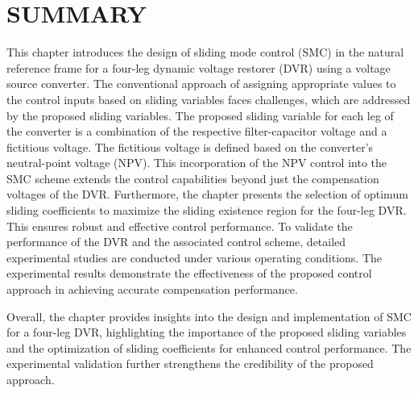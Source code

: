\section{SUMMARY}
This chapter introduces the design of sliding mode control (SMC) in the natural reference frame for a four-leg dynamic voltage restorer (DVR) using a voltage source converter. The conventional approach of assigning appropriate values to the control inputs based on sliding variables faces challenges, which are addressed by the proposed sliding variables.
The proposed sliding variable for each leg of the converter is a combination of the respective filter-capacitor voltage and a fictitious voltage. The fictitious voltage is defined based on the converter's neutral-point voltage (NPV). This incorporation of the NPV control into the SMC scheme extends the control capabilities beyond just the compensation voltages of the DVR.
Furthermore, the chapter presents the selection of optimum sliding coefficients to maximize the sliding existence region for the four-leg DVR. This ensures robust and effective control performance.
To validate the performance of the DVR and the associated control scheme, detailed experimental studies are conducted under various operating conditions. The experimental results demonstrate the effectiveness of the proposed control approach in achieving accurate compensation performance.

Overall, the chapter provides insights into the design and implementation of SMC for a four-leg DVR, highlighting the importance of the proposed sliding variables and the optimization of sliding coefficients for enhanced control performance. The experimental validation further strengthens the credibility of the proposed approach.


